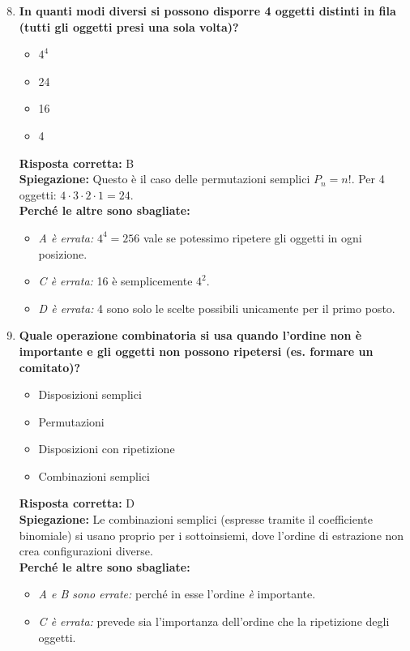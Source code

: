 \documentclass[12pt, a4paper]{article}
\begin{document}
\begin{enumerate}[label=\textbf{\arabic*.}]
\setcounter{enumi}{7}
    \item \textbf{In quanti modi diversi si possono disporre 4 oggetti distinti in fila (tutti gli oggetti presi una sola volta)?}
    \begin{itemize}
        \item[A)] $4^4$
        \item[B)] 24
        \item[C)] 16
        \item[D)] 4
    \end{itemize}
    \textbf{Risposta corretta:} B \\
    \textbf{Spiegazione:} Questo è il caso delle permutazioni semplici $P_n = n!$. Per 4 oggetti: $4 \cdot 3 \cdot 2 \cdot 1 = 24$. \\
    \textbf{Perché le altre sono sbagliate:}
    \begin{itemize}
        \item \textit{A è errata:} $4^4 = 256$ vale se potessimo ripetere gli oggetti in ogni posizione.
        \item \textit{C è errata:} 16 è semplicemente $4^2$.
        \item \textit{D è errata:} 4 sono solo le scelte possibili unicamente per il primo posto.
    \end{itemize}

    \item \textbf{Quale operazione combinatoria si usa quando l'ordine non è importante e gli oggetti non possono ripetersi (es. formare un comitato)?}
    \begin{itemize}
        \item[A)] Disposizioni semplici
        \item[B)] Permutazioni
        \item[C)] Disposizioni con ripetizione
        \item[D)] Combinazioni semplici
    \end{itemize}
    \textbf{Risposta corretta:} D \\
    \textbf{Spiegazione:} Le combinazioni semplici (espresse tramite il coefficiente binomiale) si usano proprio per i sottoinsiemi, dove l'ordine di estrazione non crea configurazioni diverse. \\
    \textbf{Perché le altre sono sbagliate:}
    \begin{itemize}
        \item \textit{A e B sono errate:} perché in esse l'ordine \textit{è} importante.
        \item \textit{C è errata:} prevede sia l'importanza dell'ordine che la ripetizione degli oggetti.
    \end{itemize}


\end{enumerate}
\end{document}
